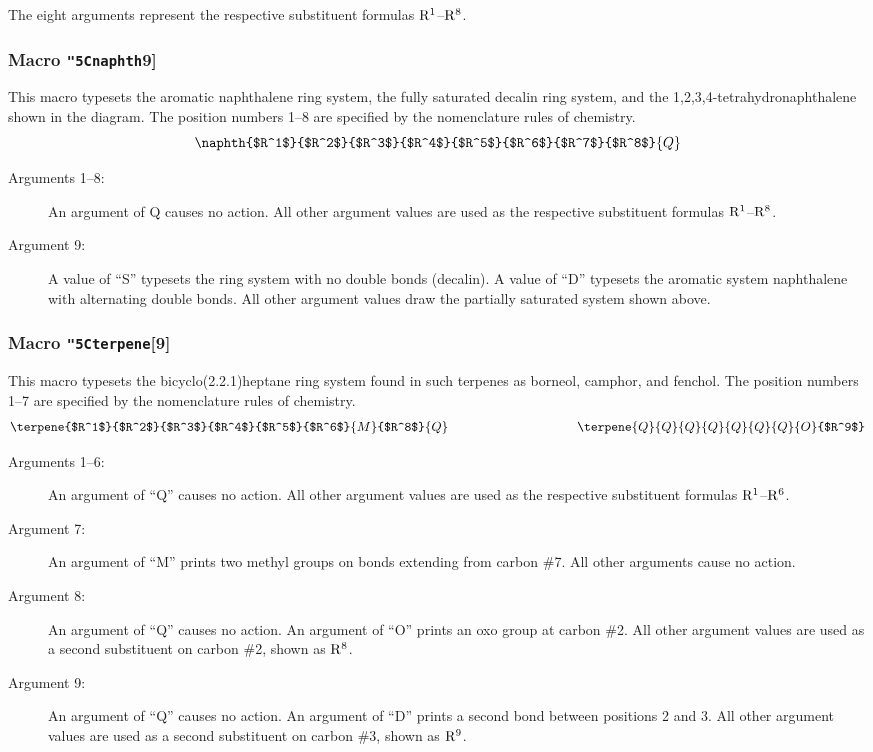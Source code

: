  The eight arguments represent the respective substituent formulas
 ${\rm R^1}$--${\rm R^8}$.
 
\subsubsection{Macro {\tt\char"5C{}naphth}9]}
  This macro typesets the aromatic naphthalene ring system,
 the fully saturated decalin ring system, and the
 1,2,3,4-tetra\-hydro\-naphthalene shown in the diagram. The position
 numbers 1--8 are specified by the nomenclature rules of
 chemistry.
 \[ \naphth{$R^1$}{$R^2$}{$R^3$}{$R^4$}{$R^5$}{$R^6$}{$R^7$}
           {$R^8$}{Q} \]
 
 \begin{description}
 \item[{\rm Arguments 1--8:}] An argument of Q causes
      no action. All other argument values are used as the
      respective substituent formulas ${\rm R^1}$--${\rm R^8}$.
 \item[{\rm Argument 9:}] A value of ``S'' typesets the
      ring system with no double bonds (decalin). A value of ``D''
      typesets the aromatic system naphthalene with alternating
      double bonds. All other argument values draw the partially
      saturated system shown above.
 \end{description}
 
\subsubsection{Macro {\tt\char"5C{}terpene}[9]}
  This macro typesets the bicyclo(2.2.1)heptane ring system
 found in such terpenes as borneol, camphor, and fenchol.
 The position numbers 1--7 are specified by the
 nomenclature rules of chemistry.
 \[ \terpene{$R^1$}{$R^2$}{$R^3$}{$R^4$}{$R^5$}{$R^6$}
            {M}{$R^8$}{Q}   \hspace{3.5cm}
    \terpene{Q}{Q}{Q}{Q}{Q}{Q}{Q}{O}{$R^9$} \]
 
 \begin{description}
 \item[{\rm Arguments 1--6:}]  An argument of ``Q''
       causes no action. All other argument values are used
       as the respective substituent formulas ${\rm R^1}$--${\rm R^6}$.
 \item[{\rm Argument 7:}] An argument of ``M''
       prints two methyl groups on bonds extending from
       carbon \#7.  All other arguments cause no action.
 \item[{\rm Argument 8:}] An argument of ``Q''
      causes no action. An argument of ``O'' prints an
      oxo group at carbon \#2. All other argument values
      are used as a second substituent on carbon \#2,
      shown as ${\rm R^8}$.
 \item[{\rm Argument 9:}] An argument of ``Q''
      causes no action. An argument of ``D'' prints a second bond
      between positions 2 and 3. All other argument values
      are used as a second substituent on carbon \#3,
      shown as ${\rm R^9}$.
 \end{description}
 
